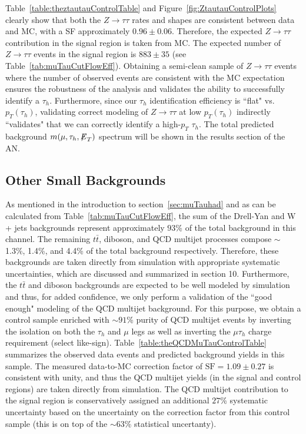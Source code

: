 Table~\ref{table:theztautauControlTable} and Figure~\ref{fig:ZtautauControlPlots} clearly show that both the $Z \to \tau\tau$ rates and shapes are consistent 
between data and MC, with a SF approximately $0.96 \pm 0.06$. Therefore, the expected $Z \to \tau\tau$ contribution in the signal region is taken from MC. The 
expected number of $Z \to \tau\tau$ events in the signal region is $883 \pm 35$ (see Table~\ref{tab:muTauCutFlowEff}). 
Obtaining a semi-clean sample of $Z \to \tau\tau$ events where the number of observed events are consistent with the MC expectation ensures the robustness of the 
analysis and validates the ability to successfully identify a $\tau_{h}$. Furthermore, since our $\tau_{h}$ identification efficiency is ``flat" vs. 
$p_{T}(\tau_{h})$, validating correct modeling of $Z \to \tau\tau$ at low $p_{T}(\tau_{h})$ indirectly ``validates" that we can correctly identify a high-$p_{T}$ 
$\tau_{h}$. The total predicted background $m(\mu,\tau_{h},{\not\mathrel{E}}_T)$ spectrum will be shown in the results section of the AN.

\subsection{Other Small Backgrounds}

As mentioned in the introduction to section~\ref{sec:muTauhad} and as can be calculated from Table~\ref{tab:muTauCutFlowEff}, the sum of the Drell-Yan and W + 
jets backgrounds represent approximately $93$\% of the total background in this channel. The remaining $t\bar{t}$, diboson, and QCD multijet processes compose 
$\sim$ 1.3\%, 1.4\%, and 4.4\% of the total background respectively. Therefore, these backgrounds are taken directly from simulation with appropriate systematic 
uncertainties, which are discussed and summarized in section 10. Furthermore, the $t\bar{t}$ and diboson backgrounds are expected to be well modeled by simulation 
and thus, for added confidence, we only perform a validation of the ``good enough" modeling of the QCD multijet background. For this purpose, we obtain a control 
sample enriched with $\sim 91$\% purity of QCD multijet events by inverting the isolation on both the $\tau_{h}$ and $\mu$ legs as well as inverting the 
$\mu\tau_{h}$ charge requirement (select like-sign). Table~\ref{table:theQCDMuTauControlTable} summarizes the observed data events and predicted background yields 
in this sample. The measured data-to-MC correction factor of $\textrm{SF}=1.09 \pm 0.27$ is consistent with unity, and thus the QCD multijet yields (in the 
signal and control regions) are taken directly from simulation. The QCD multijet contribution to the signal region is conservatively assigned an additional $27$\% 
systematic uncertainty based on the uncertainty on the correction factor from this control sample (this is on top of the $\sim 63$\% statistical uncertanty).

